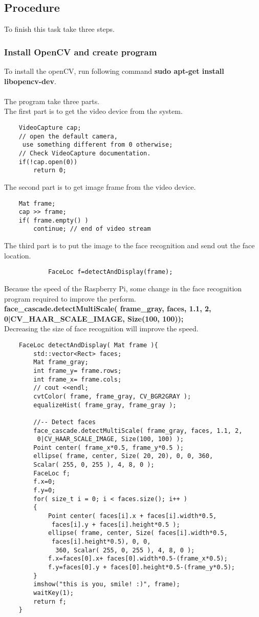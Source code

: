 \documentclass{article}
\begin{document}
\subsection{Procedure}
To finish this task take three steps.
\subsubsection{Install OpenCV and create program}
	To install the openCV, run following command \textbf{sudo apt-get install libopencv-dev}.
	\\\\
	The program take three parts.\\
	The first part is to get the video device from the system.\\
		\begin{lstlisting}
	VideoCapture cap;
	// open the default camera,
	 use something different from 0 otherwise;
	// Check VideoCapture documentation.
	if(!cap.open(0))
		return 0;
		\end{lstlisting}
	The second part is to get image frame from the video device.
		\begin{lstlisting}
	Mat frame;
	cap >> frame;
	if( frame.empty() ) 
		continue; // end of video stream
		\end{lstlisting}
	The third part is to put the image to the face recognition and send out the face location.
		\begin{lstlisting}
			FaceLoc f=detectAndDisplay(frame);
		\end{lstlisting}
		Because the speed of the Raspberry Pi, some change in the face recognition program required to improve the perform.\\
		\textbf{face\_cascade.detectMultiScale( frame\_gray, faces, 1.1, 2, 0|CV\_HAAR\_SCALE\_IMAGE, Size(100, 100));}\\
		Decreasing the size of face recognition will improve the speed.
		\begin{lstlisting}
	FaceLoc detectAndDisplay( Mat frame ){
		std::vector<Rect> faces;
		Mat frame_gray;
		int frame_y= frame.rows;
		int frame_x= frame.cols;
		// cout <<endl; 
		cvtColor( frame, frame_gray, CV_BGR2GRAY );
		equalizeHist( frame_gray, frame_gray );
			
		//-- Detect faces
		face_cascade.detectMultiScale( frame_gray, faces, 1.1, 2,
		 0|CV_HAAR_SCALE_IMAGE, Size(100, 100) );
		Point center( frame_x*0.5, frame_y*0.5 );
		ellipse( frame, center, Size( 20, 20), 0, 0, 360, 
		Scalar( 255, 0, 255 ), 4, 8, 0 );
		FaceLoc f;
		f.x=0;
		f.y=0;
		for( size_t i = 0; i < faces.size(); i++ )
		{
			Point center( faces[i].x + faces[i].width*0.5,
			 faces[i].y + faces[i].height*0.5 );
			ellipse( frame, center, Size( faces[i].width*0.5,
			 faces[i].height*0.5), 0, 0,
			  360, Scalar( 255, 0, 255 ), 4, 8, 0 );
			f.x=faces[0].x+ faces[0].width*0.5-(frame_x*0.5);
			f.y=faces[0].y + faces[0].height*0.5-(frame_y*0.5);
		}
		imshow("this is you, smile! :)", frame);
		waitKey(1);
		return f;
	}
		\end{lstlisting}
\end{document}
